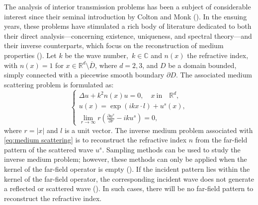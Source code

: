 \documentclass[11pt,reqno]{amsart}
\theoremstyle{definition}
\theoremstyle{remark}
\numberwithin{equation}{section}
\begin{document}
The analysis of interior transmission problems has been a subject of considerable interest since their seminal introduction by Colton and Monk (\cite{CM88}). In the ensuing years, these problems have stimulated a rich body of literature dedicated to both their direct analysis—concerning existence, uniqueness, and spectral theory—and their inverse counterparts, which focus on the reconstruction of medium properties (\cite{CCH16,CK19}). Let $ k $ be the wave number,~$k\in\mathbb{C}$ and $ n(x) $ the refractive index, with $ n(x) = 1 $ for $ x \in \mathbb{R}^d \setminus \overline{D} $, where $ d = 2, 3 $, and $ D $ be a domain bounded, simply connected with a piecewise smooth boundary $\partial D$. The associated medium scattering problem is formulated as:
\begin{equation}\label{eq:medium scattering}
	\left\{
	\begin{aligned}
		\Delta u + k^2 n(x) u = 0, \quad x~\text{in} \quad \mathbb{R}^d, \\
		u(x) = \exp(ikx \cdot l) + u^s(x), \\
		\lim_{r \to \infty} r \left( \frac{\partial u^s}{\partial r} - ik u^s \right) = 0,
	\end{aligned}
	\right.
\end{equation}
where $r=|x|$ and $l$ is a unit vector. The inverse medium problem associated with \eqref{eq:medium scattering} is to reconstruct the refractive index $n$ from the far-field pattern of the scattered wave $u^s$. Sampling methods can be used to study the inverse medium problem; however, these methods can only be applied when the kernel of the far-field operator is empty (\cite{CK19}). If the incident pattern lies within the kernel of the far-field operator, the corresponding incident wave does not generate a reflected or scattered wave (\cite{CPS07}). In such cases, there will be no far-field pattern to reconstruct the refractive index.
\end{document}

